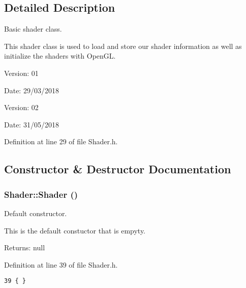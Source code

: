 \subsection{Detailed Description}
Basic shader class. 

This shader class is used to load and store our shader information as well as initialize the shaders with OpenGL.

\begin{Desc}
\item[Version:]01 \end{Desc}
\begin{Desc}
\item[Date:]29/03/2018\end{Desc}
\begin{Desc}
\item[Version:]02 \end{Desc}
\begin{Desc}
\item[Date:]31/05/2018 \end{Desc}


Definition at line 29 of file Shader.h.

\subsection{Constructor \& Destructor Documentation}
\hypertarget{class_shader_0d654ebaca4e0555197c0724c6d30610}{
\subsubsection[Shader]{\setlength{\rightskip}{0pt plus 5cm}Shader::Shader ()}}
\label{class_shader_0d654ebaca4e0555197c0724c6d30610}


Default constructor. 

This is the default constuctor that is empyty.

\begin{Desc}
\item[Returns:]null \end{Desc}


Definition at line 39 of file Shader.h.

\begin{Code}\begin{verbatim}39 { }
\end{verbatim}
\end{Code}


